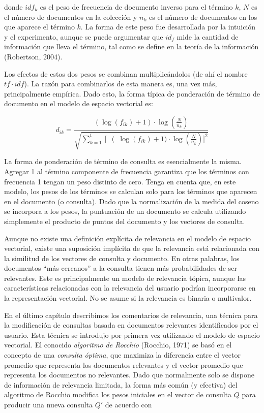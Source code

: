 donde $idf_k$ es el peso de frecuencia de documento inverso para el término $k$, $N$ es el número de documentos en la colección y $n_k$ es el número de documentos en los que aparece el término $k$. La forma de este peso fue desarrollada por la intuición y el experimento, aunque se puede argumentar que $id_f$ mide la cantidad de información que lleva el término, tal como se define en la teoría de la información (Robertson, 2004).

Los efectos de estos dos pesos se combinan multiplicándolos (de ahí el nombre $tf \cdot idf$). La razón para combinarlos de esta manera es, una vez más, principalmente empírica. Dado esto, la forma típica de ponderación de término de documento en el modelo de espacio vectorial es:

$$d_{ik} = \frac{(\log{(f_{ik})} + 1) \cdot \log{(\frac{N}{n_k})}}{\sqrt{\sum_{k=1}^{t}\left[ \right  (\log{(f_{ik})} + 1)\cdot \log{(\frac{N}{n_k})}]^2}}$$

La forma de ponderación de término de consulta es esencialmente la misma. Agregar 1 al término componente de frecuencia garantiza que los términos con frecuencia 1 tengan un peso distinto de cero. Tenga en cuenta que, en este modelo, los pesos de los términos se calculan solo para los términos que aparecen en el documento (o consulta). Dado que la normalización de la medida del coseno se incorpora a los pesos, la puntuación de un documento se calcula utilizando simplemente el producto de puntos del documento y los vectores de consulta.

Aunque no existe una definición explícita de relevancia en el modelo de espacio vectorial, existe una suposición implícita de que la relevancia está relacionada con la similitud de los vectores de consulta y documento. En otras palabras, los documentos ``más cercanos'' a la consulta tienen más probabilidades de ser relevantes. Este es principalmente un modelo de relevancia tópica, aunque las características relacionadas con la relevancia del usuario podrían incorporarse en la representación vectorial. No se asume si la relevancia es binaria o multivalor.

En el último capítulo describimos los comentarios de relevancia, una técnica para la modificación de consultas basada en documentos relevantes identificados por el usuario. Esta técnica se introdujo por primera vez utilizando el modelo de espacio vectorial. El conocido \textit{algoritmo de Rocchio} (Rocchio, 1971) se basó en el concepto de una \textit{consulta óptima}, que maximiza la diferencia entre el vector promedio que representa los documentos relevantes y el vector promedio que representa los documentos no relevantes. Dado que normalmente solo se dispone de información de relevancia limitada, la forma más común (y efectiva) del algoritmo de Rocchio modifica los pesos iniciales en el vector de consulta $Q$ para producir una nueva consulta $Q'$ de acuerdo con

